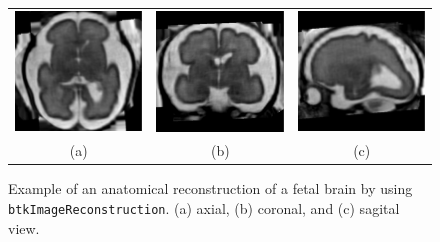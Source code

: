 \begin{description}
\end{description}

\begin{figure}[t]
\centering
\begin{tabular}{ccc}
\includegraphics[width=0.3\columnwidth]{hr_axl.eps}&
\includegraphics[width=0.3\columnwidth]{hr_cor.eps}&
\includegraphics[width=0.3\columnwidth]{hr_sag.eps}\\
{(a)}&{(b)}&{(c)}\\
\end{tabular}
\caption{Example of an anatomical reconstruction of a fetal brain by using
\texttt{btkImageReconstruction}. (a) axial, (b) coronal, and (c) sagital view.}
\label{fig:reconstruction}
\end{figure}

